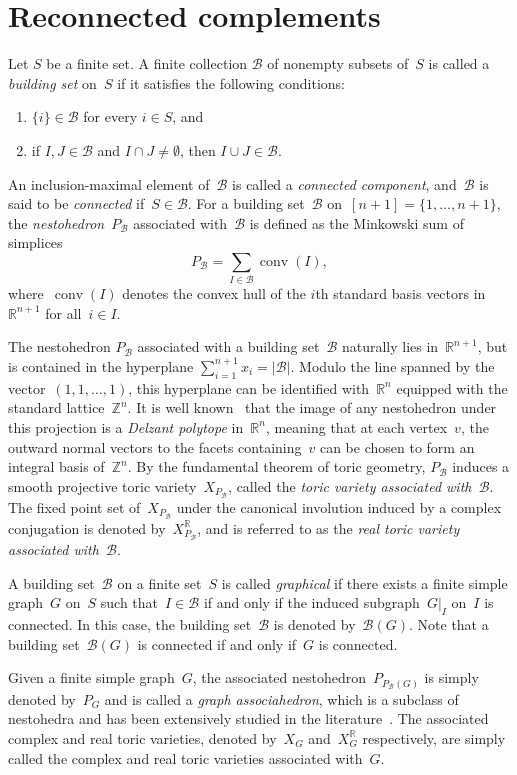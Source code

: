 \documentclass[10pt]{amsart}
\theoremstyle{plain}
\numberwithin{equation}{section}
\theoremstyle{definition}
\newcommand{\B}{\mathcal{B}}
\newcommand{\R}{\mathbb{R}}
\newcommand{\Z}{\mathbb{Z}}
\DeclareMathOperator{\conv}{conv}
\begin{document}
\section{Reconnected complements}\label{sec:pre}

Let $S$ be a finite set.
A finite collection $\B$ of nonempty subsets of~$S$ is called a \emph{building set} on~$S$ if it satisfies the following conditions:
\begin{enumerate}
    \item $\{i\} \in \B$ for every $i \in S$, and
    \item if $I, J \in \B$ and $I \cap J \neq \emptyset$, then $I \cup J \in \B$.
\end{enumerate}
An inclusion-maximal element of~$\B$ is called a \emph{connected component}, and~$\B$ is said to be \emph{connected} if~$S \in \B$.  
For a building set~$\B$ on~$[n+1] = \{1, \ldots, n+1\}$, the \emph{nestohedron}~$P_{\B}$ associated with~$\B$ is defined as the Minkowski sum of simplices
$$
    P_\B = \sum_{I \in \B} \conv(I),
$$
where~$\conv(I)$ denotes the convex hull of the $i$th standard basis vectors in~$\R^{n+1}$ for all~$i \in I$.

The nestohedron $P_\B$ associated with a building set~$\B$ naturally lies in~$\R^{n+1}$, but is contained in the hyperplane $\sum_{i=1}^{n+1} x_i = |\B|$. 
Modulo the line spanned by the vector~$(1,1,\ldots,1)$, this hyperplane can be identified with~$\R^n$ equipped with the standard lattice~$\Z^n$.
It is well known~\cite{Postnikov2009} that the image of any nestohedron under this projection is a \emph{Delzant polytope} in~$\R^n$, meaning that at each vertex~$v$, the outward normal vectors to the facets containing~$v$ can be chosen to form an integral basis of~$\Z^n$.
By the fundamental theorem of toric geometry, $P_\B$ induces a smooth projective toric variety~$X_{P_\B}$, called the \emph{toric variety associated with~$\B$}.
The fixed point set of~$X_{P_\B}$ under the canonical involution induced by a complex conjugation is denoted by~$X^\R_{P_\B}$, and is referred to as the \emph{real toric variety associated with~$\B$}.

A building set~$\B$ on a finite set~$S$ is called \emph{graphical} if there exists a finite simple graph~$G$ on~$S$ such that~$I \in \B$ if and only if the induced subgraph~$G|_I$ on~$I$ is connected.  
In this case, the building set~$\B$ is denoted by~$\B(G)$.
Note that a building set~$\B(G)$ is connected if and only if~$G$ is connected.

Given a finite simple graph~$G$, the associated nestohedron~$P_{P_\B(G)}$ is simply denoted by~$P_G$ and is called a \emph{graph associahedron}, which is a subclass of nestohedra and has been extensively studied in the literature~\cite{Carr-Devadoss2006, Zel2006, Postnikov2008, Devadoss2009, Choi-Park2015, Rodrigo-Jensen-Dhruv2016, Choi-Hwang2023}.
The associated complex and real toric varieties, denoted by~$X_G$ and~$X^\R_G$ respectively, are simply called the complex and real toric varieties associated with~$G$.
\end{document}
